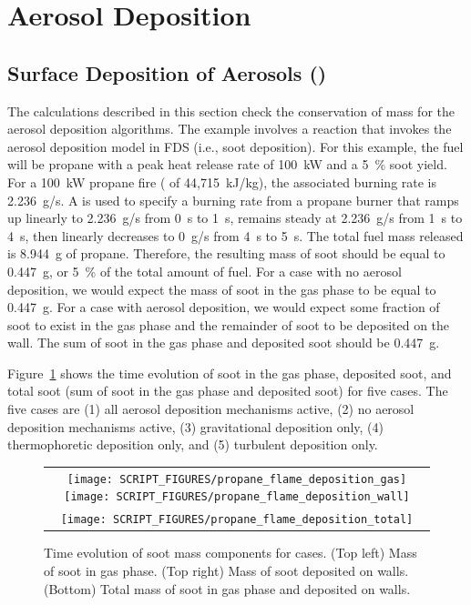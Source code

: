 \documentclass[11pt]{book}
\begin{document}
\clearpage

\section{Aerosol Deposition}

\subsection{Surface Deposition of Aerosols (\texorpdfstring{}{propane\_flame\_deposition})}
\label{propane_flame_deposition}

The calculations described in this section check the conservation of mass for the aerosol deposition algorithms. The example involves a reaction that invokes the aerosol deposition model in FDS (i.e., soot deposition). For this example, the fuel will be propane with a peak heat release rate of 100~kW and a 5~\% soot yield. For a 100~kW propane fire ( of 44,715~kJ/kg), the associated burning rate is 2.236~g/s. A  is used to specify a burning rate from a propane burner that ramps up linearly to 2.236~g/s from 0~s to 1~s, remains steady at 2.236~g/s from 1~s to 4~s, then linearly decreases to 0~g/s from 4~s to 5~s. The total fuel mass released is 8.944~g of propane. Therefore, the resulting mass of soot should be equal to 0.447~g, or 5~\% of the total amount of fuel. For a case with no aerosol deposition, we would expect the mass of soot in the gas phase to be equal to 0.447~g. For a case with aerosol deposition, we would expect some fraction of soot to exist in the gas phase and the remainder of soot to be deposited on the wall. The sum of soot in the gas phase and deposited soot should be 0.447~g.

Figure~\ref{fig:deposition_mass} shows the time evolution of soot in the gas phase, deposited soot, and total soot (sum of soot in the gas phase and deposited soot) for five cases. The five cases are (1) all aerosol deposition mechanisms active, (2) no aerosol deposition mechanisms active, (3) gravitational deposition only, (4) thermophoretic deposition only, and (5) turbulent deposition only.

\begin{figure}[ht]
\centering
\begin{tabular}{c}
\texttt{[image: SCRIPT\_FIGURES/propane\_flame\_deposition\_gas]}
\texttt{[image: SCRIPT\_FIGURES/propane\_flame\_deposition\_wall]} \\
\texttt{[image: SCRIPT\_FIGURES/propane\_flame\_deposition\_total]}
\end{tabular}
\caption[Soot mass conservation for  case]{Time evolution of soot mass components for  cases. (Top left) Mass of soot in gas phase. (Top right) Mass of soot deposited on walls. (Bottom) Total mass of soot in gas phase and deposited on walls.}
\label{fig:deposition_mass}
\end{figure}
\end{document}
